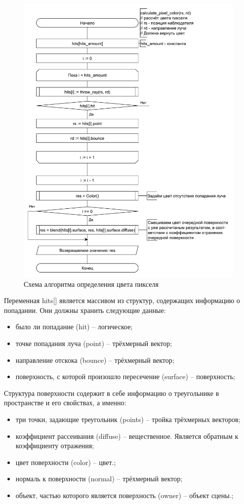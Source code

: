 \documentclass[a4paper, 14pt]{report}
\begin{document}
	\begin{figure}[!ht]
		\centering
		\includegraphics[width=1\linewidth]{calculate_pixel_color}
		\caption{Схема алгоритма определения цвета пикселя}
		\label{fig:calculate_pixel_color}
	\end{figure}

	Переменная hits[] является массивом из структур, содержащих информацию о попадании. Они должны хранить следующие данные:
	\begin{itemize}
		\item было ли попадание (hit) – логическое;
		\item точке попадания луча (point) – трёхмерный вектор;
		\item направление отскока (bounce) – трёхмерный вектор;
		\item поверхность, с которой произошло пересечение (surface) – поверхность;
	\end{itemize}

	Структура поверхности содержит в себе информацию о треугольнике в пространстве и его свойствах, а именно:
	\begin{itemize}
		\item три точки, задающие треугольник (points) – тройка трёхмерных векторов;
		\item коэффициент рассеивания (diffuse) – вещественное. Является обратным к коэффициенту отражения;
		\item цвет поверхности (color) – цвет.;
		\item нормаль к поверхности (normal) – трёхмерный вектор;
		\item объект, частью которого является поверхность (owner) – объект сцены.;
	\end{itemize}
	
\end{document}
